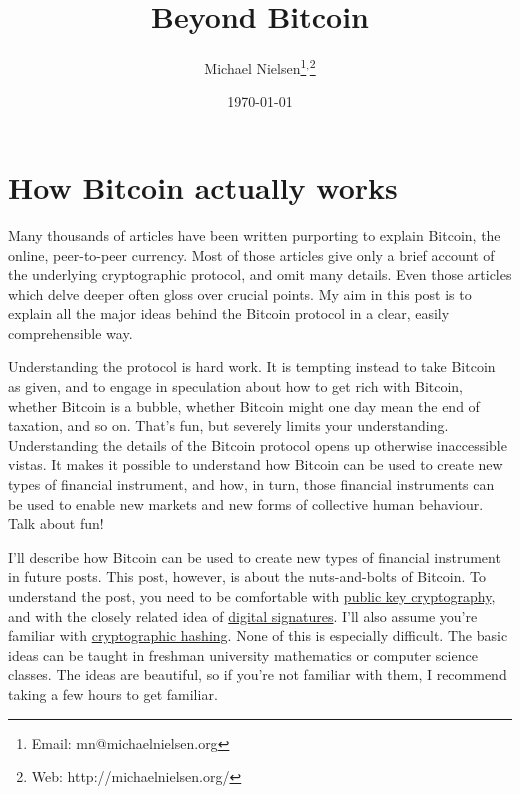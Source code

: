 \documentclass[12pt]{book}
\newcommand{\link}[2]{\href{#1}{#2}}
\begin{document}
\title{Beyond Bitcoin}
\author{Michael Nielsen\thanks{Email: mn@michaelnielsen.org}$^{,}$\thanks{Web: http://michaelnielsen.org/}}
\date{\today}

\maketitle

\pagestyle{headings}

\tableofcontents

\chapter{How Bitcoin actually works}

%
%
Many thousands of articles have been written purporting to explain
Bitcoin, the online, peer-to-peer currency.  Most of those articles
give only a brief account of the underlying cryptographic protocol,
and omit many details.  Even those articles which delve deeper often
gloss over crucial points.  My aim in this post is to explain all the
major ideas behind the Bitcoin protocol in a clear, easily
comprehensible way.

%
%
Understanding the protocol is hard work.  It is tempting instead to
take Bitcoin as given, and to engage in speculation about how to get
rich with Bitcoin, whether Bitcoin is a bubble, whether Bitcoin might
one day mean the end of taxation, and so on.  That's fun, but severely
limits your understanding.  Understanding the details of the Bitcoin
protocol opens up otherwise inaccessible vistas.  It makes it possible
to understand how Bitcoin can be used to create new types of financial
instrument, and how, in turn, those financial instruments can be used
to enable new markets and new forms of collective human behaviour.
Talk about fun!

%
%
I'll describe how Bitcoin can be used to create new types of financial
instrument in future posts.  This post, however, is about the
nuts-and-bolts of Bitcoin.  To understand the post, you need to be
comfortable with
\link{http://en.wikipedia.org/wiki/Public-key_cryptography}{public key
  cryptography}, and with the closely related idea of
\link{https://en.wikipedia.org/wiki/Digital_signature}{digital
  signatures}.  I'll also assume you're familiar with
\link{https://en.wikipedia.org/wiki/Cryptographic_hash_function}{cryptographic
  hashing}.  None of this is especially difficult.  The basic ideas
can be taught in freshman university mathematics or computer science
classes.  The ideas are beautiful, so if you're not familiar with
them, I recommend taking a few hours to get familiar.
\end{document}
